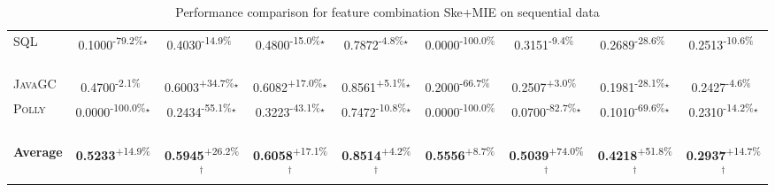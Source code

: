 \begin{table}[htbp]
\begin{tabular}{l|cccc|cccc}
\textsc{SQL} & \cellcolor{red!30}0.1000\textsuperscript{-79.2\%}$^\star$ & \cellcolor{red!30}0.4030\textsuperscript{-14.9\%}$^{\,\,\,}$ & \cellcolor{red!30}0.4800\textsuperscript{-15.0\%}$^\star$ & \cellcolor{red!30}0.7872\textsuperscript{-4.8\%}$^\star$ & \cellcolor{red!30}0.0000\textsuperscript{-100.0\%}$^{\,\,\,}$ & \cellcolor{red!30}0.3151\textsuperscript{-9.4\%}$^{\,\,\,}$ & \cellcolor{red!30}0.2689\textsuperscript{-28.6\%}$^{\,\,\,}$ & \cellcolor{red!30}0.2513\textsuperscript{-10.6\%}$^{\,\,\,}$ \\
\textsc{JavaGC} & \cellcolor{red!30}0.4700\textsuperscript{-2.1\%}$^{\,\,\,}$ & \cellcolor{green!30}0.6003\textsuperscript{+34.7\%}$^\star$ & \cellcolor{green!30}0.6082\textsuperscript{+17.0\%}$^\star$ & \cellcolor{green!30}0.8561\textsuperscript{+5.1\%}$^\star$ & \cellcolor{red!30}0.2000\textsuperscript{-66.7\%}$^{\,\,\,}$ & \cellcolor{green!30}0.2507\textsuperscript{+3.0\%}$^{\,\,\,}$ & \cellcolor{red!30}0.1981\textsuperscript{-28.1\%}$^\star$ & \cellcolor{red!30}0.2427\textsuperscript{-4.6\%}$^{\,\,\,}$ \\
\textsc{Polly} & \cellcolor{red!30}0.0000\textsuperscript{-100.0\%}$^\star$ & \cellcolor{red!30}0.2434\textsuperscript{-55.1\%}$^\star$ & \cellcolor{red!30}0.3223\textsuperscript{-43.1\%}$^\star$ & \cellcolor{red!30}0.7472\textsuperscript{-10.8\%}$^\star$ & \cellcolor{red!30}0.0000\textsuperscript{-100.0\%}$^{\,\,\,}$ & \cellcolor{red!30}0.0700\textsuperscript{-82.7\%}$^\star$ & \cellcolor{red!30}0.1010\textsuperscript{-69.6\%}$^\star$ & \cellcolor{red!30}0.2310\textsuperscript{-14.2\%}$^\star$ \\
\hline
\textbf{Average} & \cellcolor{green!30}\textbf{0.5233}\textsuperscript{+14.9\%}$^{\,\,\,}$ & \cellcolor{green!30}\textbf{0.5945}\textsuperscript{+26.2\%}$^\dagger$ & \cellcolor{green!30}\textbf{0.6058}\textsuperscript{+17.1\%}$^\dagger$ & \cellcolor{green!30}\textbf{0.8514}\textsuperscript{+4.2\%}$^\dagger$ & \cellcolor{green!30}\textbf{0.5556}\textsuperscript{+8.7\%}$^{\,\,\,}$ & \cellcolor{green!30}\textbf{0.5039}\textsuperscript{+74.0\%}$^\dagger$ & \cellcolor{green!30}\textbf{0.4218}\textsuperscript{+51.8\%}$^\dagger$ & \cellcolor{green!30}\textbf{0.2937}\textsuperscript{+14.7\%}$^\dagger$ \\
\hline
\end{tabular}
\caption{Performance comparison for feature combination Ske+MIE on sequential data}
\label{tab:combo_Ske_MIE_performance_sequential}
\end{table}